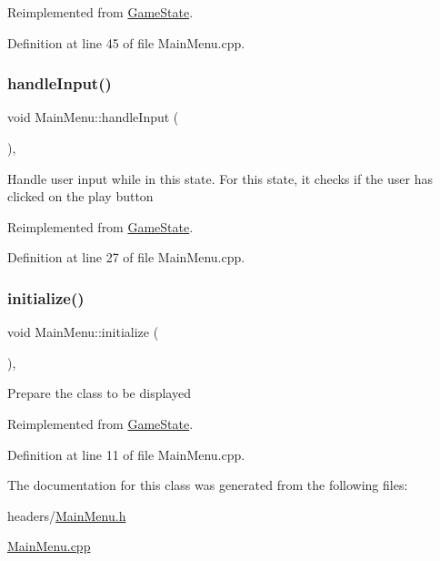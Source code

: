 Reimplemented from \mbox{\hyperlink{class_game_state_adf753ecc90e0b309c849b117036e619e}{Game\+State}}.



Definition at line 45 of file Main\+Menu.\+cpp.

\mbox{\label{class_main_menu_aa73613e97c322cba65028f3693b8c665}} 
\subsubsection{\texorpdfstring{handleInput()}{handleInput()}}
{\footnotesize\ttfamily void Main\+Menu\+::handle\+Input (\begin{DoxyParamCaption}{ }\end{DoxyParamCaption})\hspace{0.3cm}{\ttfamily [override]}, {\ttfamily [virtual]}}

Handle user input while in this state. For this state, it checks if the user has clicked on the play button 

Reimplemented from \mbox{\hyperlink{class_game_state_a734dd3521eb3056ee7d3f3e7c982b5a9}{Game\+State}}.



Definition at line 27 of file Main\+Menu.\+cpp.

\mbox{\label{class_main_menu_a039698cefc631351e79f097c41e39d1c}} 
\subsubsection{\texorpdfstring{initialize()}{initialize()}}
{\footnotesize\ttfamily void Main\+Menu\+::initialize (\begin{DoxyParamCaption}{ }\end{DoxyParamCaption})\hspace{0.3cm}{\ttfamily [override]}, {\ttfamily [virtual]}}

Prepare the class to be displayed 

Reimplemented from \mbox{\hyperlink{class_game_state_a22d3404f53895a23359557a713194736}{Game\+State}}.



Definition at line 11 of file Main\+Menu.\+cpp.



The documentation for this class was generated from the following files\+:\begin{DoxyCompactItemize}
\item 
headers/\mbox{\hyperlink{_main_menu_8h}{Main\+Menu.\+h}}\item 
\mbox{\hyperlink{_main_menu_8cpp}{Main\+Menu.\+cpp}}\end{DoxyCompactItemize}
